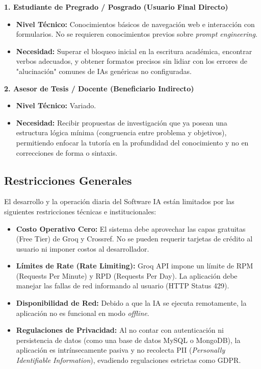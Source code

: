 \textbf{1. Estudiante de Pregrado / Posgrado (Usuario Final Directo)}
\begin{itemize}
    \item \textbf{Nivel Técnico:} Conocimientos básicos de navegación web e interacción con formularios. No se requieren conocimientos previos sobre \textit{prompt engineering}.
    \item \textbf{Necesidad:} Superar el bloqueo inicial en la escritura académica, encontrar verbos adecuados, y obtener formatos precisos sin lidiar con los errores de "alucinación" comunes de IAs genéricas no configuradas.
\end{itemize}

\textbf{2. Asesor de Tesis / Docente (Beneficiario Indirecto)}
\begin{itemize}
    \item \textbf{Nivel Técnico:} Variado.
    \item \textbf{Necesidad:} Recibir propuestas de investigación que ya posean una estructura lógica mínima (congruencia entre problema y objetivos), permitiendo enfocar la tutoría en la profundidad del conocimiento y no en correcciones de forma o sintaxis.
\end{itemize}

\subsection{Restricciones Generales}
El desarrollo y la operación diaria del Software IA están limitados por las siguientes restricciones técnicas e institucionales:
\begin{itemize}
    \item \textbf{Costo Operativo Cero:} El sistema debe aprovechar las capas gratuitas (Free Tier) de Groq y Crossref. No se pueden requerir tarjetas de crédito al usuario ni imponer costos al desarrollador.
    \item \textbf{Límites de Rate (Rate Limiting):} Groq API impone un límite de RPM (Requests Per Minute) y RPD (Requests Per Day). La aplicación debe manejar las fallas de red informando al usuario (HTTP Status 429).
    \item \textbf{Disponibilidad de Red:} Debido a que la IA se ejecuta remotamente, la aplicación no es funcional en modo \textit{offline}.
    \item \textbf{Regulaciones de Privacidad:} Al no contar con autenticación ni persistencia de datos (como una base de datos MySQL o MongoDB), la aplicación es intrínsecamente pasiva y no recolecta PII (\textit{Personally Identifiable Information}), evadiendo regulaciones estrictas como GDPR.
\end{itemize}

